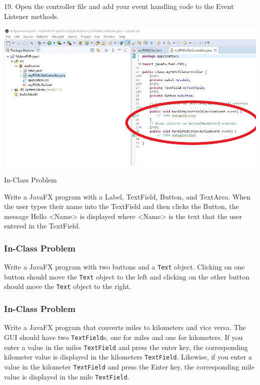 \documentclass{beamer}
\newcommand{\mil}[1]{\texttt{#1}}
\begin{document}
\begin{frame}
19. Open the controller file and add your event handling code to the Event Listener methods.
        \begin{center}
            \includegraphics[scale=.2]{event_listeners.jpg}
        \end{center}
\end{frame}

\begin{frame}{In-Class Problem}

Write a JavaFX program with a Label, TextField, Button, and TextArea.  When the user types their name into the TextField and then clicks the Button, the message Hello <Name> is displayed where <Name> is the text that the user entered in the TextField.
\end{frame}

\begin{frame}

    \frametitle{In-Class Problem}
    
Write a JavaFX program with two buttons and a \mil{Text} object.  Clicking on one button should move the \mil{Text} object to the left and clicking on the other button should move the \mil{Text} object to the right.
  
\end{frame}

\begin{frame}

    \frametitle{In-Class Problem}
    
Write a JavaFX program that converts miles to kilometers and vice versa.  The GUI should have two \mil{TextField}s, one for miles and one for kilometers.  If you enter a value in the miles \mil{TextField} and press the enter key, the corresponding kilometer value is displayed in the kilometers \mil{TextField}.  Likewise, if you enter a value in the kilometer \mil{TextField} and press the Enter key, the corresponding mile value is displayed in the mile \mil{TextField}.    
\end{frame}
\end{document}
